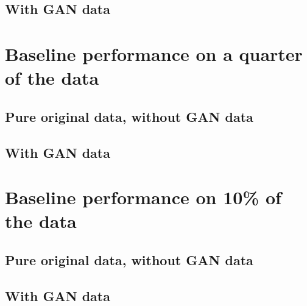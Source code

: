 \subsection{With GAN data}
\section{Baseline performance on a quarter of the data}
\subsection{Pure original data, without GAN data}
\subsection{With GAN data}
\section{Baseline performance on 10\% of the data}
\subsection{Pure original data, without GAN data}
\subsection{With GAN data}
